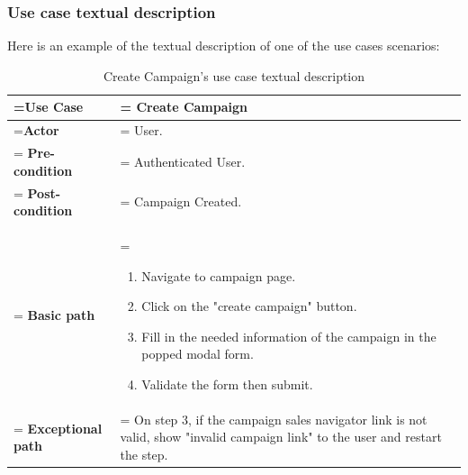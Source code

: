 \subsubsection{Use case textual description}
Here is an example of the textual description of one of the use cases scenarios:
\begin{table}[H]
	\renewcommand{\arraystretch}{1.5}%
	\caption{Create Campaign's use case textual description}
	\centering
	\medskip
	\begin{tabularx}{1\textwidth} {
			| >{\hsize=0.5\hsize\linewidth=\hsize\centering\arraybackslash}X
			| >{\hsize=1.5\hsize\linewidth=\hsize\justifying\arraybackslash}X |}
		\hline
		\textbf {Use Case}         & \noindent Create Campaign                                                                                                              \\
		\hline
		\textbf {Actor}            & \noindent User.                                                                                                                        \\
		\hline
		\textbf {Pre-condition}    & \noindent Authenticated User.                                                                                                          \\
		\hline
		\textbf {Post-condition}   & \noindent Campaign Created.                                                                                                            \\
		\hline
		\textbf {Basic path}       & \noindent    \begin{enumerate}
			                                          \item Navigate to campaign page.
			                                          \item Click on the "create campaign" button.
			                                          \item Fill in the needed information of the campaign in the popped modal form.
			                                          \item Validate the form then submit.
		                                          \end{enumerate}                                             \\
		\hline
		\textbf {Exceptional path} & \noindent On step 3, if the campaign sales navigator link is not valid, show "invalid campaign link" to the user and restart the step. \\
		\hline
	\end{tabularx}
\end{table}


